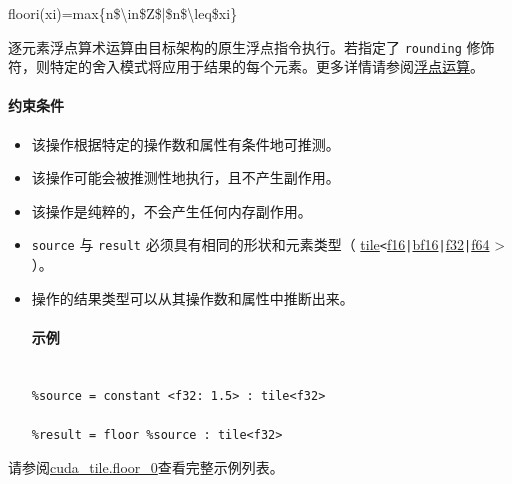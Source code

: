 \documentclass{article}
\begin{document}
floori(xi)=max\{n\$\textbackslash{}in\$Z\$|\$n\$\textbackslash{}leq\$xi\}


逐元素浮点算术运算由目标架构的原生浮点指令执行。若指定了 \texttt{rounding} 修饰符，则特定的舍入模式将应用于结果的每个元素。更多详情请参阅\href{https://docs.nvidia.com/cuda/tile-ir/latest/sections/operations.html#op-group-floating-point}{浮点运算}。





\paragraph{约束条件}


\begin{itemize}
\item 该操作根据特定的操作数和属性有条件地可推测。
\item 该操作可能会被推测性地执行，且不产生副作用。
\item 该操作是纯粹的，不会产生任何内存副作用。
\item \texttt{source} 与 \texttt{result} 必须具有相同的形状和元素类型（ \href{https://docs.nvidia.com/cuda/tile-ir/latest/sections/types.html#type-tile}{tile}\texttt{<}\href{https://docs.nvidia.com/cuda/tile-ir/latest/sections/types.html#subsection-element-types}{f16}\texttt{|}\href{https://docs.nvidia.com/cuda/tile-ir/latest/sections/types.html#subsection-element-types}{bf16}\texttt{|}\href{https://docs.nvidia.com/cuda/tile-ir/latest/sections/types.html#subsection-element-types}{f32}\texttt{|}\href{https://docs.nvidia.com/cuda/tile-ir/latest/sections/types.html#subsection-element-types}{f64} > ）。
\item 操作的结果类型可以从其操作数和属性中推断出来。




\paragraph{示例}


\begin{lstlisting}

%source = constant <f32: 1.5> : tile<f32>

%result = floor %source : tile<f32>

\end{lstlisting}



\end{itemize}
请参阅\href{https://docs.nvidia.com/cuda/tile-ir/latest/sections/appendix.html#example-cuda-tile-floor-0}{cuda\_tile.floor\_0}查看完整示例列表。
\end{document}
